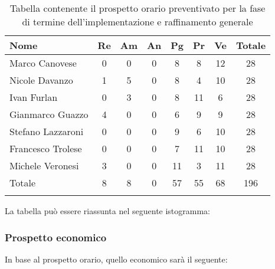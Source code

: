 			\begin{longtable}{|l|c|c|c|c|c|c|c|}
				\hline
				\rowcolor{lighter-grayer}
				\textbf{Nome} & \textbf{Re} & \textbf{Am} & \textbf{An} & \textbf{Pg}  & \textbf{Pr}   & \textbf{Ve} & \textbf{Totale} \\
				\hline
				\endfirsthead
				
				\hline
				Marco Canovese & 0 & 0 & 0 & 8 & 8 & 12 & 28\\
				\hline
				\hline
				Nicole Davanzo & 1 & 5 & 0 & 8 & 4 & 10 & 28\\
				\hline
				\hline
				Ivan Furlan & 0 & 3 & 0 & 8 & 11 & 6 & 28\\
				\hline
				\hline
				Gianmarco Guazzo & 4 & 0 & 0 & 6 & 9 & 9 & 28\\
				\hline
				\hline
				Stefano Lazzaroni & 0 & 0 & 0 & 9 & 6 & 10 & 28\\
				\hline
				\hline
				Francesco Trolese & 0 & 0 & 0 & 7 & 11 & 10 & 28\\
				\hline
				\hline
				Michele Veronesi & 3 & 0 & 0 & 11 & 3 & 11 & 28\\
				\hline 
				\hline
				Totale & 8 & 8 & 0 & 57 & 55 & 68 & 196\\
				\hline 
				\caption{Tabella contenente il prospetto orario preventivato per la fase di termine dell'implementazione e raffinamento generale}
			\end{longtable}

		
			La tabella può essere riassunta nel seguente istogramma:
		
		
			\subsubsection{Prospetto economico}
			In base al prospetto orario, quello economico sarà il seguente: 
			
